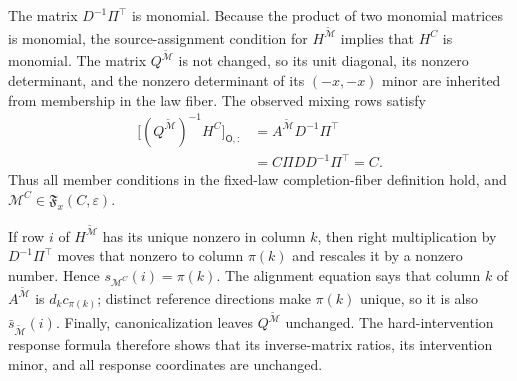 The matrix \(D^{-1}\Pi^\top\) is monomial. Because the product of two monomial matrices is monomial, the source-assignment condition for \(H^{\widetilde{\mathcal M}}\) implies that \(H^C\) is monomial. The matrix \(Q^{\widetilde{\mathcal M}}\) is not changed, so its unit diagonal, its nonzero determinant, and the nonzero determinant of its \((-x,-x)\) minor are inherited from membership in the law fiber. The observed mixing rows satisfy
\[
 \begin{aligned}
 \bigl[(Q^{\widetilde{\mathcal M}})^{-1}H^C\bigr]_{\mathsf O,:}
 &=A^{\widetilde{\mathcal M}}D^{-1}\Pi^\top\\
 &=C\Pi DD^{-1}\Pi^\top=C. \tag{8}
 \end{aligned}
\]
Thus all member conditions in the fixed-law completion-fiber definition hold, and \(\mathcal M^C\in\mathfrak F_x(C,\varepsilon)\).

If row \(i\) of \(H^{\widetilde{\mathcal M}}\) has its unique nonzero in column \(k\), then right multiplication by \(D^{-1}\Pi^\top\) moves that nonzero to column \(\pi(k)\) and rescales it by a nonzero number. Hence \(s_{\mathcal M^C}(i)=\pi(k)\). The alignment equation says that column \(k\) of \(A^{\widetilde{\mathcal M}}\) is \(d_kc_{\pi(k)}\); distinct reference directions make \(\pi(k)\) unique, so it is also \(\bar s_{\widetilde{\mathcal M}}(i)\). Finally, canonicalization leaves \(Q^{\widetilde{\mathcal M}}\) unchanged. The hard-intervention response formula therefore shows that its inverse-matrix ratios, its intervention minor, and all response coordinates are unchanged.